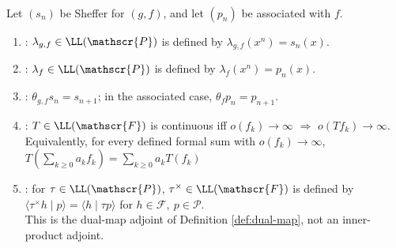 \begin{definition} \label{def:umbral-operator-and-shift}
\label{def:continuous-operators-on-umbral-algebra}
\label{def:operator-adjoint-on-umbral-algebra}
\\
Let $(s_n)$ be Sheffer for $(g,f)$, and let $(p_n)$ be associated with $f$.
\begin{enumerate}[label=(\roman*)]
\setlength{\itemsep}{0pt}
\item {}: $\lambda_{g,f}\in\LL(\mathscr{P})$ is defined by $\lambda_{g,f}(x^n)=s_n(x)$.
\item {}: $\lambda_f\in\LL(\mathscr{P})$ is defined by $\lambda_f(x^n)=p_n(x)$.
\item {}: $\theta_{g,f}s_n=s_{n+1}$; in the associated case, $\theta_fp_n=p_{n+1}$.
\item {}: $T\in\LL(\mathscr{F})$ is continuous iff $o(f_k)\to\infty$ $\Longrightarrow$ $o(Tf_k)\to\infty$.\\
Equivalently, for every defined formal sum with $o(f_k)\to\infty$, $T\left(\sum\limits_{k\geq0}a_kf_k\right) =\sum\limits_{k\geq0}a_kT(f_k)$
\item {}: for $\tau\in\LL(\mathscr{P})$, $\tau^\times\in\LL(\mathscr{F})$ is defined by $\langle \tau^\times h\mid p\rangle =\langle h\mid \tau p\rangle$ for $h\in\mathscr{F},\ p\in\mathscr{P}$.\\
This is the dual-map adjoint of Definition \ref{def:dual-map}, not an inner-product adjoint.
\end{enumerate}
\end{definition}

